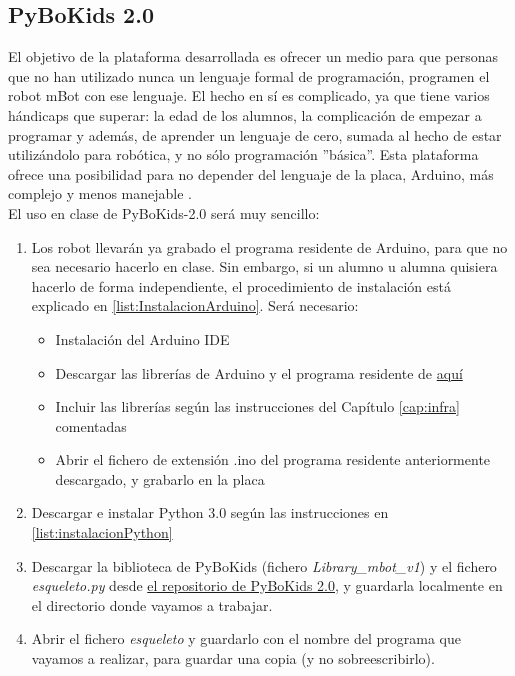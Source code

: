 \subsection{PyBoKids 2.0}
El objetivo de la plataforma desarrollada es ofrecer un medio para que personas que no han utilizado nunca un lenguaje formal de programación, programen el robot mBot con ese lenguaje. El hecho en sí es complicado, ya que tiene varios hándicaps que superar: la edad de los alumnos, la complicación de empezar a programar y además, de aprender un lenguaje de cero, sumada al hecho de estar utilizándolo para robótica, y no sólo programación ''básica''. Esta plataforma ofrece una posibilidad para no depender del lenguaje de la placa, Arduino, más complejo y menos manejable . \\
El uso en clase de  PyBoKids-2.0 será muy sencillo:
\begin{enumerate}
	\item Los robot llevarán ya grabado el programa residente de Arduino, para que no sea necesario hacerlo en clase. Sin embargo, si un alumno u alumna quisiera hacerlo de forma independiente, el procedimiento de instalación está explicado en \ref{list:InstalacionArduino}. Será necesario: 
	\begin{itemize}
		\item Instalación del Arduino IDE
		\item Descargar las librerías de Arduino y el programa residente de \href{https://github.com/JdeRobot/PyBoKids/tree/main/PyBoKids%202.0}{aquí}
		\item Incluir las librerías según las instrucciones del Capítulo \ref{cap:infra} comentadas
		\item Abrir el fichero de extensión .ino del programa residente anteriormente descargado, y grabarlo en la placa
	\end{itemize}
	\item Descargar e instalar Python 3.0 según las instrucciones en \ref{list:instalacionPython}
	\item Descargar la biblioteca de PyBoKids (fichero \textit{Library\_mbot\_v1}) y el fichero \textit{esqueleto.py} desde \href{https://github.com/JdeRobot/PyBoKids/tree/main/PyBoKids%202.0}{el repositorio de PyBoKids 2.0}, y guardarla localmente en el directorio donde vayamos a trabajar.	
	\item Abrir el fichero \textit{esqueleto} y guardarlo con el nombre del programa que vayamos a realizar, para guardar una copia (y no sobreescribirlo).
\end{enumerate}

